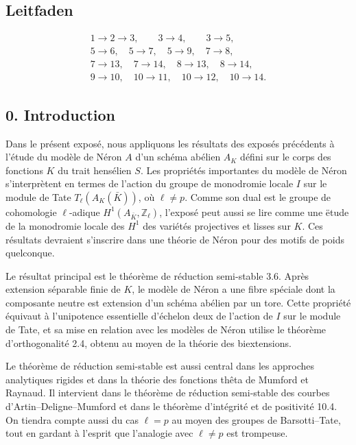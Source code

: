 \documentclass[11pt]{article}
\providecommand{\Z}{\mathbb Z}
\begin{document}
\subsection*{Leitfaden}
\[
\begin{gathered}
1\to2\to3,\qquad 3\to4,\qquad 3\to5,\\
5\to6,\quad 5\to7,\quad 5\to9,\quad 7\to8,\\
7\to13,\quad 7\to14,\quad 8\to13,\quad 8\to14,\\
9\to10,\quad 10\to11,\quad 10\to12,\quad 10\to14.
\end{gathered}
\]


\subsection*{0. Introduction}
Dans le pr\'esent expos\'e, nous appliquons les r\'esultats des expos\'es pr\'ec\'edents \`a l'\'etude du mod\`ele de N\'eron \(A\) d'un sch\'ema ab\'elien \(A_K\) d\'efini sur le corps des fonctions \(K\) du trait hens\'elien \(S\).  Les propri\'et\'es importantes du mod\`ele de N\'eron s'interpr\`etent en termes de l'action du groupe de monodromie locale \(I\) sur le module de Tate \(T_\ell(A_K(\bar K))\), o\`u \(\ell\ne p\).  Comme son dual est le groupe de cohomologie \(\ell\)-adique \(H^1(A_{\bar K},\Z_\ell)\), l'expos\'e peut aussi se lire comme une \"etude de la monodromie locale des \(H^1\) des vari\'et\'es projectives et lisses sur \(K\).  Ces r\'esultats devraient s'inscrire dans une th\'eorie de N\'eron pour des motifs de poids quelconque.

Le r\'esultat principal est le th\'eor\`eme de r\'eduction semi-stable 3.6.  Apr\`es extension s\'eparable finie de \(K\), le mod\`ele de N\'eron a une fibre sp\'eciale dont la composante neutre est extension d'un sch\'ema ab\'elien par un tore.  Cette propri\'et\'e \'equivaut \`a l'unipotence essentielle d'\'echelon deux de l'action de \(I\) sur le module de Tate, et sa mise en relation avec les mod\`eles de N\'eron utilise le th\'eor\`eme d'orthogonalit\'e 2.4, obtenu au moyen de la th\'eorie des biextensions.

Le th\'eor\`eme de r\'eduction semi-stable est aussi central dans les approches analytiques rigides et dans la th\'eorie des fonctions th\^eta de Mumford et Raynaud.  Il intervient dans le th\'eor\`eme de r\'eduction semi-stable des courbes d'Artin--Deligne--Mumford et dans le th\'eor\`eme d'int\'egrit\'e et de positivit\'e 10.4.  On tiendra compte aussi du cas \(\ell=p\) au moyen des groupes de Barsotti--Tate, tout en gardant \`a l'esprit que l'analogie avec \(\ell\ne p\) est trompeuse.
\end{document}
